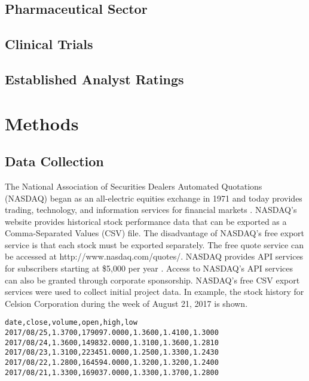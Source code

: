 \documentclass[sigconf]{acmart}
\begin{document}
\subsection{Pharmaceutical Sector}

\subsection{Clinical Trials}


\subsection{Established Analyst Ratings}

\section{Methods}
\subsection{Data Collection}

The National Association of Securities Dealers Automated Quotations (NASDAQ) began as an all-electric equities exchange in 1971 and today provides trading, technology, and information services for financial markets  \cite{www-nasdaq}. NASDAQ's website provides historical stock performance data that can be exported as a Comma-Separated Values (CSV) file. The disadvantage of NASDAQ's free export service is that each stock must be exported separately. The free quote service can be accessed at http://www.nasdaq.com/quotes/. NASDAQ provides API services for subscribers starting at \$5,000 per year \cite{www-nasdaq-sub}. Access to NASDAQ's API services can also be granted through corporate sponsorship. NASDAQ's free CSV export services were used to collect initial project data. In example, the stock history for Celsion Corporation during the week of August 21, 2017 is shown.

\begin{mdframed}[style=default]
\begin{lstlisting}
date,close,volume,open,high,low
2017/08/25,1.3700,179097.0000,1.3600,1.4100,1.3000
2017/08/24,1.3600,149832.0000,1.3100,1.3600,1.2810
2017/08/23,1.3100,223451.0000,1.2500,1.3300,1.2430
2017/08/22,1.2800,164594.0000,1.3200,1.3200,1.2400
2017/08/21,1.3300,169037.0000,1.3300,1.3700,1.2800
\end{lstlisting}
\end{mdframed} 
\end{document}
